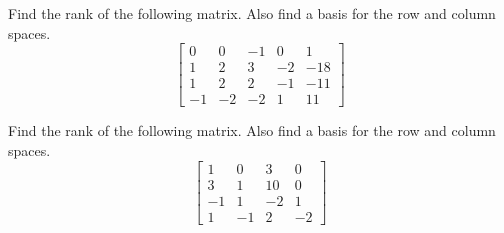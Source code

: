\documentclass{ximera}
\begin{document}
\begin{problem}\label{prb:5.36} Find the rank of the following matrix. Also find a basis for the row
and column spaces.
\begin{equation*}
\left[
\begin{array}{rrrrr}
0 & 0 & -1 & 0 & 1 \\
1 & 2 & 3 & -2 & -18 \\
1 & 2 & 2 & -1 & -11 \\
-1 & -2 & -2 & 1 & 11
\end{array}
\right]
\end{equation*}
\end{problem}

\begin{problem}\label{prb:5.37} Find the rank of the following matrix. Also find a basis for the row
and column spaces.
\begin{equation*}
\left[
\begin{array}{rrrr}
1 & 0 & 3 & 0 \\
3 & 1 & 10 & 0 \\
-1 & 1 & -2 & 1 \\
1 & -1 & 2 & -2
\end{array}
\right]
\end{equation*}
\end{problem}
\end{document}
